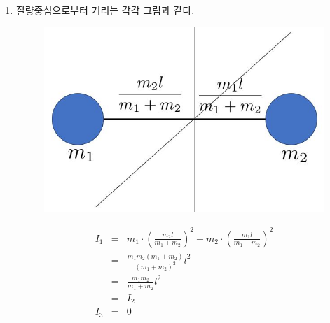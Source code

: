 \documentclass[a4paper,11pt,fleqn]{article}
\newcommand{\n}{\newline}
\begin{document}
\begin{enumerate}[start=12]
\newpage
\item
질량중심으로부터 거리는 각각 그림과 같다.
\begin{figure}[h]
	\begin{center}
		\includegraphics[scale=0.5]{img/dumbell}
	\end{center}
\end{figure}
\n
\begin{eqnarray*}
	I_1 &=& m_1 \cdot \left( \frac{m_2 l}{m_1 + m_2} \right) ^2 + m_2 \cdot \left( \frac{m_1 l}{m_1 + m_2 } \right) ^2 \\
	&=& \frac{m_1 m_2 ( m_1 + m_2 )}{( m_1 + m_2 ) ^2} l^2 \\
	&=& \frac{m_1 m_2}{m_1 + m_2} l^2 \\
	&=& I_2 \\
	I_3 &=& 0
\end{eqnarray*}
\n\n\n




\end{enumerate}

\end{document}
